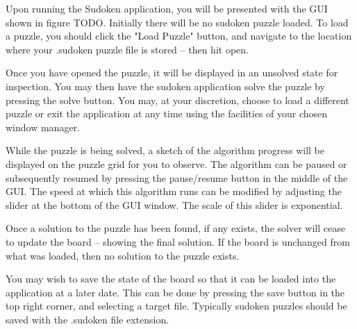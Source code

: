 Upon running the Sudoken application, you will be presented with the GUI shown in figure TODO. Initially there will be no sudoken puzzle loaded. To load a puzzle, you should click the "Load Puzzle" button, and navigate to the location where your .sudoken puzzle file is stored -- then hit open.

Once you have opened the puzzle, it will be displayed in an unsolved state for inspection. You may then have the sudoken application solve the puzzle by pressing the solve button. You may, at your discretion, choose to load a different puzzle or exit the application at any time using the facilities of your chosen window manager.

While the puzzle is being solved, a sketch of the algorithm progress will be displayed on the puzzle grid for you to observe. The algorithm can be paused or subsequently resumed by pressing the pause/resume button in the middle of the GUI. The speed at which this algorithm runs can be modified by adjusting the slider at the bottom of the GUI window. The scale of this slider is exponential.

Once a solution to the puzzle has been found, if any exists, the solver will cease to update the board -- showing the final solution. If the board is unchanged from what was loaded, then no solution to the puzzle exists.

You may wish to save the state of the board so that it can be loaded into the application at a later date. This can be done by pressing the save button in the top right corner, and selecting a target file. Typically sudoken puzzles should be saved with the .sudoken file extension.

